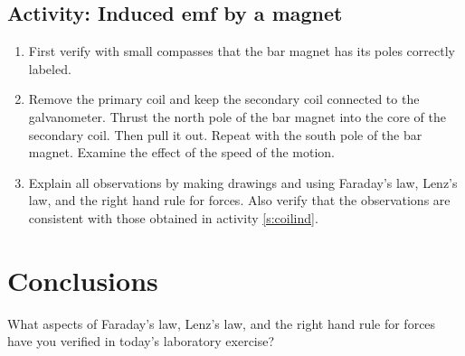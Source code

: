 \begin{multicols}{2}
\subsection{Activity: Induced emf by a magnet}
\begin{enumerate}
	 \item First verify with small compasses that the bar magnet has its poles correctly labeled.
	\item  Remove the primary coil and keep the secondary coil connected to the galvanometer.  Thrust the north pole of the bar magnet into the core of the secondary coil.  Then pull it out.  Repeat with the south pole of the bar magnet.  Examine the effect of the speed of the motion.  
	\item Explain all observations by making drawings and using Faraday's law, Lenz's law, and the \textsf{right hand rule for forces}.  Also verify that the observations are consistent with those obtained in activity \ref{s:coilind}. 
\end{enumerate}

\section{Conclusions}
 What aspects of Faraday's law, Lenz's law, and the \textsf{right hand rule for forces} have you verified in today's laboratory exercise?
 

\end{multicols}
\endinput
